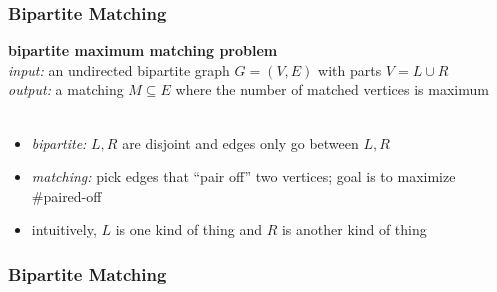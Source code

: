 \documentclass{beamer}
\newcommand{\stanza}{ \\~\ }
\begin{document}
\begin{frame} \frametitle{Bipartite Matching}
\textbf{bipartite maximum matching problem} \\
\emph{input:} an undirected bipartite graph $G=(V, E)$ with parts $V=L \cup R$ \\
\emph{output:} a matching $M \subseteq E$ where the number of matched vertices
  is maximum \stanza

\begin{itemize}
  \item \emph{bipartite:} $L, R$ are disjoint and edges only go between $L, R$
  \item \emph{matching:} pick edges that ``pair off'' two vertices; goal is to
    maximize \#paired-off
  \item intuitively, $L$ is one kind of thing and $R$ is another kind of thing
\end{itemize}
\end{frame}

\begin{frame} \frametitle{Bipartite Matching}
\begin{center}
\end{center}
\end{frame}
\end{document}
